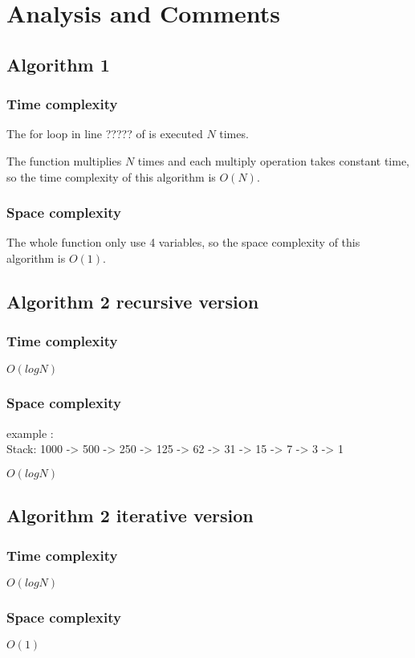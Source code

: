 \chapter{Analysis and Comments}

\section{Algorithm 1}

\subsection{Time complexity}
The for loop in line ????? of is executed $N$ times.

The function multiplies $N$ times and each multiply operation takes constant time, so the time complexity of this algorithm is $O(N)$.
\subsection{Space complexity}
The whole function only use 4 variables, so the space complexity of this algorithm is $O(1)$.

\section{Algorithm 2 recursive version}

\subsection{Time complexity}
$O(logN)$
\subsection{Space complexity}

example :\\
Stack: 1000 -> 500 -> 250 -> 125 -> 62 -> 31 -> 15 -> 7 -> 3 -> 1

$O(logN)$

\section{Algorithm 2 iterative version}

\subsection{Time complexity}
$O(logN)$
\subsection{Space complexity}
$O(1)$